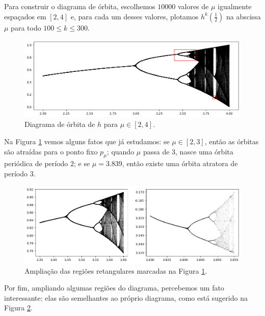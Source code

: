 Para construir o diagrama de órbita, escolhemos $10000$ valores de $\mu$ igualmente espaçados em $[2, 4]$ e, para cada um desses valores, plotamos $h^k(\frac{1}{2})$ na abscissa $\mu$ para todo $100 \leq k \leq 300$.

\begin{figure}[!htb]
\centering
\includegraphics[scale=0.6]{images/period-doubling-and-zoom-1.png}
\caption{Diagrama de órbita de $h$ para $\mu \in [2, 4]$.}
\label{period-doubling}
\end{figure}

Na Figura \ref{period-doubling} vemos alguns fatos que já estudamos: se $\mu \in [2, 3]$, então as órbitas são atraídas para o ponto fixo $p_\mu$; quando $\mu$ passa de $3$, nasce uma órbita periódica de período $2$; e se $\mu = 3.839$, então existe uma órbita atratora de período $3$.

\begin{figure}[H]
\centering
\includegraphics[scale=0.6]{images/period-doubling-and-zoom-2.png}
\caption{Ampliação das regiões retangulares marcadas na Figura \ref{period-doubling}.}
\label{period-doubling1}
\end{figure}

Por fim, ampliando algumas regiões do diagrama, percebemos um fato interessante: elas são semelhantes ao próprio diagrama, como está sugerido na Figura \ref{period-doubling1}.
